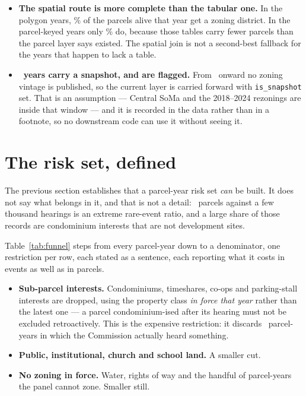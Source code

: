 \documentclass[11pt]{article}
\begin{document}
\begin{itemize}
\item \textbf{The spatial route is more complete than the tabular one.} In the polygon years,
\acqPolygonCover\% of the parcels alive that year get a zoning district. In the parcel-keyed
years only \acqTabularCover\% do, because those tables carry fewer parcels than the parcel
layer says existed. The spatial join is not a second-best fallback for the years that happen
to lack a table.
\item \textbf{\acqSnapshotYears\ years carry a snapshot, and are flagged.} From
\acqSnapshotFirst\ onward no zoning vintage is published, so the current layer is carried
forward with \texttt{is\_snapshot} set. That is an assumption --- Central SoMa and the
2018--2024 rezonings are inside that window --- and it is recorded in the data rather than in
a footnote, so no downstream code can use it without seeing it.
\end{itemize}

\section{The risk set, defined}
\label{sec:riskdef}

The previous section establishes that a parcel-year risk set \emph{can} be built. It does not
say what belongs in it, and that is not a detail: \acqRiskStart\ parcels against a few thousand
hearings is an extreme rare-event ratio, and a large share of those records are condominium
interests that are not development sites.

Table~\ref{tab:funnel} steps from every parcel-year down to a denominator, one restriction per
row, each stated as a sentence, each reporting what it costs in events as well as in parcels.

\begin{itemize}
\item \textbf{Sub-parcel interests.} Condominiums, timeshares, co-ops and parking-stall
interests are dropped, using the property class \emph{in force that year} rather than the
latest one --- a parcel condominium-ised after its hearing must not be excluded retroactively.
This is the expensive restriction: it discards \acqRiskCondoLost\ parcel-years in which the
Commission actually heard something.
\item \textbf{Public, institutional, church and school land.} A smaller cut.
\item \textbf{No zoning in force.} Water, rights of way and the handful of parcel-years the
panel cannot zone. Smaller still.
\end{itemize}
\end{document}
